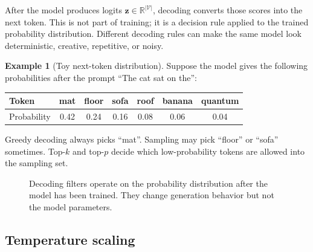 \documentclass[11pt,a4paper]{article}
\theoremstyle{definition}
\newtheorem{example}{Example}[section]
\theoremstyle{plain}
\newcommand{\vz}{\bm{z}}
\newcommand{\reals}{\mathbb{R}}
\newcommand{\vocab}{|\mathcal{V}|}
\begin{document}
After the model produces logits $\vz\in\reals^{\vocab}$, decoding converts those scores into the next token. This is not part of training; it is a decision rule applied to the trained probability distribution. Different decoding rules can make the same model look deterministic, creative, repetitive, or noisy.

\begin{example}[Toy next-token distribution]
Suppose the model gives the following probabilities after the prompt ``The cat sat on the'':
\begin{center}
\begin{tabular}{lcccccc}
\toprule
Token & mat & floor & sofa & roof & banana & quantum\\
\midrule
Probability & 0.42 & 0.24 & 0.16 & 0.08 & 0.06 & 0.04\\
\bottomrule
\end{tabular}
\end{center}
Greedy decoding always picks ``mat''. Sampling may pick ``floor'' or ``sofa'' sometimes. Top-$k$ and top-$p$ decide which low-probability tokens are allowed into the sampling set.
\end{example}

\begin{figure}[H]
\centering
{}
\caption{Decoding filters operate on the probability distribution after the model has been trained. They change generation behavior but not the model parameters.}
\label{fig:decoding-filters}
\end{figure}

\subsection{Temperature scaling}
\end{document}
